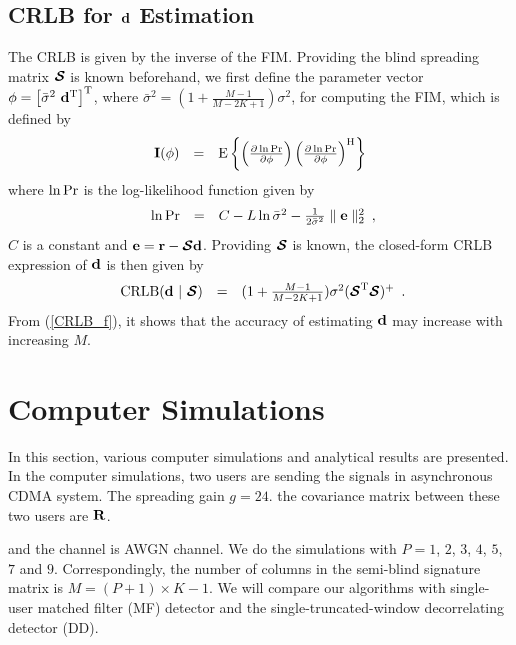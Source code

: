 \documentclass[a4paper,10pt,fleqn, twocolumn]{IEEETran}
\newcommand{\br}{{\mathbf r}}
\newcommand{\bd}{{\bf d}}
\newcommand{\bbf}{{\bf d}}
\newcommand{\bI}{{\bf I}}
\newcommand{\bR}{{\bf R}}
\newcommand{\bcS}{{\mbox {\boldmath ${\cal S}$}}}
\begin{document}
\subsection{CRLB for $\bd$ Estimation}
The CRLB is given by the inverse of the FIM. Providing the blind
spreading matrix $\bcS$ is known beforehand, we first define the
parameter vector $\mathbf{\phi} = \left[\bar{\sigma}^{2}\
\bbf^{\rm T}\right]^{\rm T}$, where $\bar{\sigma}^{2}
=(1+\frac{M-1}{M-2K+1})\sigma^{2}$, for computing the FIM, which
is defined by
\begin{equation}
\begin{array}{rcl}
\bI(\mathbf{\phi}) &=& {\rm E} \left\{ \left( \frac{\partial
\ln{\rm Pr}}{\partial \mathbf{\phi}} \right) \left( \frac{\partial
\ln{\rm Pr}}{\partial \mathbf{\phi}} \right)^{\rm H} \right\}
\label{fim}
\end{array}
\end{equation}
\noindent where $\ln{\rm Pr}$ is the log-likelihood function given
by
\begin{equation}
\begin{array}{rcl}
\ln{\rm
Pr}&=&C-L\ln\bar{\sigma}^2-\frac{1}{2\bar{\sigma}^2}\parallel\mathbf{e}\parallel_2^2
\end{array},\label{logl}
\end{equation}
\noindent $C$ is a constant and $\mathbf{e}=\br-\bcS\bbf$.
Providing $\bcS$ is known, the closed-form CRLB expression of
$\bbf$ is then given by
\begin{equation}
\begin{array}{rcl}
{\rm CRLB}(\bbf\ |\ \bcS) &
=&(1+\frac{M-1}{M-2K+1})\sigma^{2}(\bcS^{\rm T}\bcS)^{\rm +}
\end{array}.\label{CRLB_f}
\end{equation}
\noindent From (\ref{CRLB_f}), it shows that the accuracy of
estimating $\bbf$ may increase with increasing $M$.


\section{Computer Simulations}

In this section, various computer simulations and analytical
results are presented. In the computer simulations, two users are
sending the signals in asynchronous CDMA system. The spreading
gain $g=24$. the covariance matrix between these two users are
$\bR$.

\noindent and the channel is AWGN channel. We do the simulations
with $P=1$, $2$, $3$, $4$, $5$, $7$ and $9$. Correspondingly, the
number of columns in the semi-blind signature matrix is
$M=(P+1)\times K-1$. We will compare our algorithms with
single-user matched filter (MF) detector and the
single-truncated-window decorrelating detector (DD).
\end{document}
